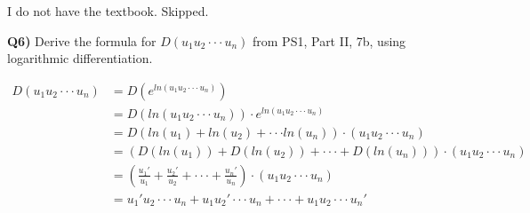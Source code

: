 \documentclass[9pt]{article}
\begin{document}
I do not have the textbook. Skipped.


\begin{tcolorbox}
  \textbf{Q6)} Derive the formula for $D(u_1u_2 \cdot \cdot \cdot u_n)$ from PS1, Part II, 7b, using logarithmic differentiation.
\end{tcolorbox}

\begin{align*}
  D(u_1u_2 \cdot \cdot \cdot u_n) &= D(e^{ln(u_1u_2 \cdot \cdot \cdot u_n)})\\
                                  &= D(ln(u_1u_2 \cdot \cdot \cdot u_n)) \cdot e^{ln(u_1u_2 \cdot \cdot \cdot u_n)}\\
                                  &= D(ln(u_1) + ln(u_2) + \cdot \cdot \cdot ln(u_n)) \cdot (u_1 u_2 \cdot \cdot \cdot u_n)\\
                                  &= (D(ln(u_1)) + D(ln(u_2)) + \cdot \cdot \cdot + D(ln(u_n))) \cdot (u_1 u_2 \cdot \cdot \cdot u_n)\\
                                  &= (\frac{u_1'}{u_1} + \frac{u_2'}{u_2} + \cdot \cdot \cdot + \frac{u_n'}{u_n}) \cdot (u_1 u_2 \cdot \cdot \cdot u_n)\\
                                  &= u_1' u_2 \cdot \cdot \cdot u_n + u_1 u_2' \cdot \cdot \cdot u_n + \cdot \cdot \cdot + u_1 u_2 \cdot \cdot \cdot u_n'
\end{align*}
\end{document}
